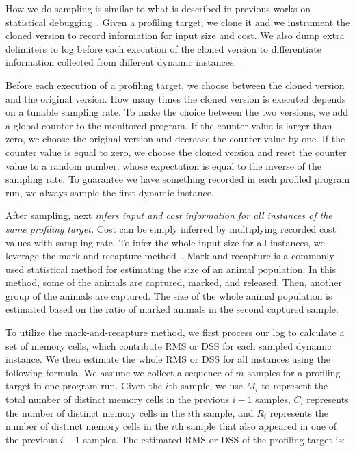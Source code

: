 {{How we do sampling is similar to what is described in previous works 
on statistical debugging~\cite{liblit03,liblit05,CCI,SongOOPSLA2014,ldoctor}.
Given a profiling target, 
we clone it
and we instrument the cloned version to record information for input size and cost.
We also dump extra delimiters to log before each 
execution of the cloned version
to differentiate information collected from different dynamic instances. 

Before each execution of a profiling target, 
we choose between the cloned version and the original version. 
How many times the cloned version is executed 
depends on a tunable sampling rate. 
To make the choice between the two versions,
we add a global counter to the monitored program. 
If the counter value is larger than zero, 
we choose the original version and decrease the counter value by one.
If the counter value is equal to zero,
we choose the cloned version and reset the counter value to 
a random number, 
whose expectation is 
equal to the inverse of the sampling rate.  
To guarantee we have something recorded in 
each profiled program run,
we always sample the first dynamic instance. 




After sampling, \Tool next \emph{infers input and cost information
for all instances of the same profiling target.} 
Cost can be simply inferred by multiplying recorded cost values with sampling rate.
To infer the whole input size for all instances, 
we leverage the mark-and-recapture method~\cite{mark-recapture}. 
Mark-and-recapture is a commonly used statistical method 
for estimating the size of an animal population. 
In this method, some of the animals are captured, marked, and released. 
Then, another group of the animals are captured.
The size of the whole animal population is estimated 
based on the ratio of marked animals in the second captured sample. 
 

To utilize the mark-and-recapture method, 
we first process our log to calculate a set of memory cells, 
which contribute RMS
or DSS for each sampled dynamic instance. 
We then estimate the whole RMS or DSS for all instances using the following formula.
We assume we collect a sequence of $m$ samples for a profiling target 
in one program run.
Given the $i$th sample, we use $M_i$ to represent the 
total number of distinct memory cells in the previous $i-1$ samples, 
$C_i$ represents the number of distinct memory cells in the $i$th sample,
and $R_i$ represents the number of distinct memory cells in 
the $i$th sample that also appeared in one of the previous $i-1$ samples.
The estimated RMS or DSS of the profiling target is:

}}
